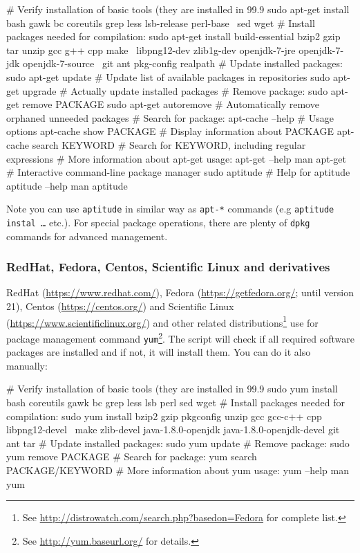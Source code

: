 \documentclass[a4paper, 11pt, twoside]{article}
\begin{document}
\begin{bashcode}
  # Verify installation of basic tools (they are installed in 99.9%
  sudo apt-get install bash gawk bc coreutils grep less lsb-release perl-base \
    sed wget
  # Install packages needed for compilation:
  sudo apt-get install build-essential bzip2 gzip tar unzip gcc g++ cpp make \
    libpng12-dev zlib1g-dev openjdk-7-jre openjdk-7-jdk openjdk-7-source \
    git ant pkg-config realpath
  # Update installed packages:
  sudo apt-get update # Update list of available packages in repositories
  sudo apt-get upgrade # Actually update installed packages
  # Remove package:
  sudo apt-get remove PACKAGE
  sudo apt-get autoremove # Automatically remove orphaned unneeded packages
  # Search for package:
  apt-cache --help # Usage options
  apt-cache show PACKAGE # Display information about PACKAGE
  apt-cache search KEYWORD # Search for KEYWORD, including regular expressions
  # More information about apt-get usage:
  apt-get --help
  man apt-get
  # Interactive command-line package manager
  sudo aptitude
  # Help for aptitude
  aptitude --help
  man aptitude
\end{bashcode}

Note you can use \texttt{aptitude} in similar way as \texttt{apt-*} commands (e.g \texttt{aptitude instal \ldots} etc.). For special package operations, there are plenty of \texttt{dpkg} commands for advanced management.

\subsubsection{RedHat, Fedora, Centos, Scientific Linux and derivatives}

RedHat (\href{https://www.redhat.com/}{https://www.redhat.com/}), Fedora (\href{https://getfedora.org/}{https://getfedora.org/}; until version 21), Centos (\href{https://centos.org/}{https://centos.org/}) and Scientific Linux (\href{https://www.scientificlinux.org/}{https://www.scientificlinux.org/}) and other related distributions\footnote{See \href{http://distrowatch.com/search.php?basedon=Fedora}{http://distrowatch.com/search.php?basedon=Fedora} for complete list.} use for package management command \texttt{yum}\footnote{See \href{http://yum.baseurl.org/}{http://yum.baseurl.org/} for details.}. The script will check if all required software packages are installed and if not, it will install them. You can do it also manually:

\begin{bashcode}
  # Verify installation of basic tools (they are installed in 99.9%
  sudo yum install bash coreutils gawk bc grep less lsb perl sed wget
  # Install packages needed for compilation:
  sudo yum install bzip2 gzip pkgconfig unzip gcc gcc-c++ cpp libpng12-devel \
    make zlib-devel java-1.8.0-openjdk java-1.8.0-openjdk-devel git ant tar
  # Update installed packages:
  sudo yum update
  # Remove package:
  sudo yum remove PACKAGE
  # Search for package:
  yum search PACKAGE/KEYWORD
  # More information about yum usage:
  yum --help
  man yum
\end{bashcode}
\end{document}
